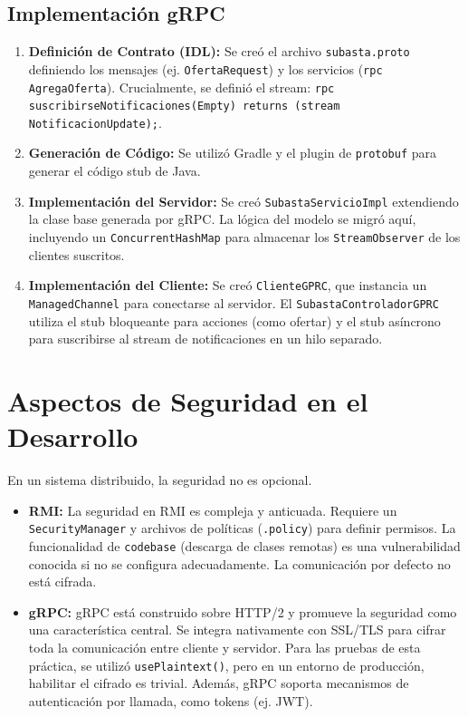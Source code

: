 \documentclass[11pt, a4paper]{article}
\begin{document}
\subsection{Implementación gRPC}
\begin{enumerate}
    \item \textbf{Definición de Contrato (IDL):} Se creó el archivo \texttt{subasta.proto} definiendo los mensajes (ej. \texttt{OfertaRequest}) y los servicios (\texttt{rpc AgregaOferta}). Crucialmente, se definió el stream: \texttt{rpc suscribirseNotificaciones(Empty) returns (stream NotificacionUpdate);}.
    \item \textbf{Generación de Código:} Se utilizó Gradle y el plugin de \texttt{protobuf} para generar el código stub de Java.
    \item \textbf{Implementación del Servidor:} Se creó \texttt{SubastaServicioImpl} extendiendo la clase base generada por gRPC. La lógica del modelo se migró aquí, incluyendo un \texttt{ConcurrentHashMap} para almacenar los \texttt{StreamObserver} de los clientes suscritos.
    \item \textbf{Implementación del Cliente:} Se creó \texttt{ClienteGPRC}, que instancia un \texttt{ManagedChannel} para conectarse al servidor. El \texttt{SubastaControladorGPRC} utiliza el stub bloqueante para acciones (como ofertar) y el stub asíncrono para suscribirse al stream de notificaciones en un hilo separado.
\end{enumerate}

\section{Aspectos de Seguridad en el Desarrollo}
\label{sec:seguridad}

En un sistema distribuido, la seguridad no es opcional.
\begin{itemize}
    \item \textbf{RMI:} La seguridad en RMI es compleja y anticuada. Requiere un \texttt{SecurityManager} y archivos de políticas (\texttt{.policy}) para definir permisos. La funcionalidad de \texttt{codebase} (descarga de clases remotas) es una vulnerabilidad conocida si no se configura adecuadamente. La comunicación por defecto no está cifrada.
    \item \textbf{gRPC:} gRPC está construido sobre HTTP/2 y promueve la seguridad como una característica central. Se integra nativamente con SSL/TLS para cifrar toda la comunicación entre cliente y servidor. Para las pruebas de esta práctica, se utilizó \texttt{usePlaintext()}, pero en un entorno de producción, habilitar el cifrado es trivial. Además, gRPC soporta mecanismos de autenticación por llamada, como tokens (ej. JWT).
\end{itemize}
\end{document}
